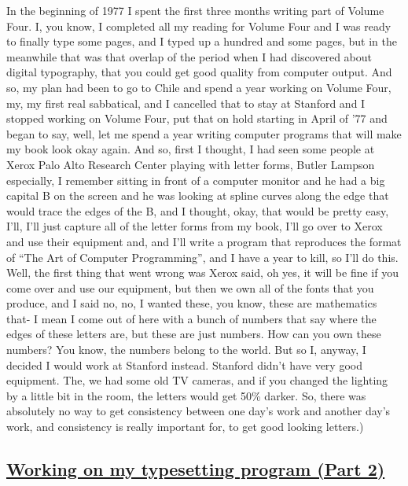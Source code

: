 \documentclass[]{article}
\begin{document}
In the beginning of 1977 I spent the first three months writing part of
Volume Four. I, you know, I completed all my reading for Volume Four and
I was ready to finally type some pages, and I typed up a hundred and
some pages, but in the meanwhile that was that overlap of the period
when I had discovered about digital typography, that you could get good
quality from computer output. And so, my plan had been to go to Chile
and spend a year working on Volume Four, my, my first real sabbatical,
and I cancelled that to stay at Stanford and I stopped working on Volume
Four, put that on hold starting in April of '77 and began to say, well,
let me spend a year writing computer programs that will make my book
look okay again. And so, first I thought, I had seen some people at
Xerox Palo Alto Research Center playing with letter forms, Butler
Lampson especially, I remember sitting in front of a computer monitor
and he had a big capital B on the screen and he was looking at spline
curves along the edge that would trace the edges of the B, and I
thought, okay, that would be pretty easy, I'll, I'll just capture all of
the letter forms from my book, I'll go over to Xerox and use their
equipment and, and I'll write a program that reproduces the format of
``The Art of Computer Programming'', and I have a year to kill, so I'll
do this. Well, the first thing that went wrong was Xerox said, oh yes,
it will be fine if you come over and use our equipment, but then we own
all of the fonts that you produce, and I said no, no, I wanted these,
you know, these are mathematics that- I mean I come out of here with a
bunch of numbers that say where the edges of these letters are, but
these are just numbers. How can you own these numbers? You know, the
numbers belong to the world. But so I, anyway, I decided I would work at
Stanford instead. Stanford didn't have very good equipment. The, we had
some old TV cameras, and if you changed the lighting by a little bit in
the room, the letters would get 50\% darker. So, there was absolutely no
way to get consistency between one day's work and another day's work,
and consistency is really important for, to get good looking letters.)

\subsection{\texorpdfstring{\href{http://webofstories.com/play/17112}{Working
on my typesetting program (Part
2)}}{Working on my typesetting program (Part 2)}}\label{working-on-my-typesetting-program-part-2}
\end{document}
